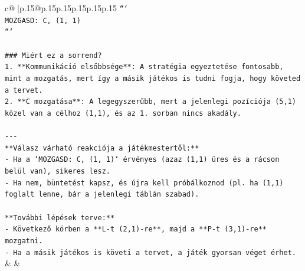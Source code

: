 \documentclass{article}
\begin{document}
{\begin{supertabular}{c@{$\;$}|p{.15\linewidth}@{}p{.15\linewidth}p{.15\linewidth}p{.15\linewidth}p{.15\linewidth}p{.15\linewidth}}
{{{\texttt{```} \\
\texttt{MOZGASD: C, (1, 1)} \\
\texttt{```} \\
\\ 
\texttt{\#\#\# Miért ez a sorrend?} \\
\texttt{1. **Kommunikáció elsőbbsége**: A stratégia egyeztetése fontosabb, mint a mozgatás, mert így a másik játékos is tudni fogja, hogy követed a tervet.} \\
\texttt{2. **C mozgatása**: A legegyszerűbb, mert a jelenlegi pozíciója (5,1) közel van a célhoz (1,1), és az 1. sorban nincs akadály.} \\
\\ 
\texttt{{-}{-}{-}} \\
\texttt{**Válasz várható reakciója a játékmestertől:**} \\
\texttt{{-} Ha a `MOZGASD: C, (1, 1)` érvényes (azaz (1,1) üres és a rácson belül van), sikeres lesz.} \\
\texttt{{-} Ha nem, büntetést kapsz, és újra kell próbálkoznod (pl. ha (1,1) foglalt lenne, bár a jelenlegi táblán szabad).} \\
\\ 
\texttt{**További lépések terve:**} \\
\texttt{{-} Következő körben a **L{-}t (2,1){-}re**, majd a **P{-}t (3,1){-}re** mozgatni.} \\
\texttt{{-} Ha a másik játékos is követi a tervet, a játék gyorsan véget érhet.} \\
            }
        }
    }
    & & \\ \\


\end{supertabular}}
\end{document}
